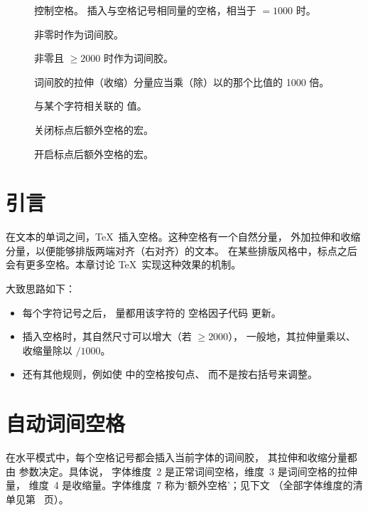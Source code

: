 \documentclass[a4paper]{rapport3}
\newenvironment{inventory}{\begin{description}}{\end{description}}
\begin{document}
\begin{inventory}

\item []
      控制空格。
      插入与空格记号相同量的空格，相当于 ${}=1000$ 时。

\item [] 
      非零时作为词间胶。

\item [] 
      非零且 ${}\geq2000$ 时作为词间胶。

\item [] 
      词间胶的拉伸（收缩）分量应当乘（除）以的那个比值的 1000 倍。

\item [] 
      与某个字符相关联的  值。

\item []
      关闭标点后额外空格的宏。

\item []
      开启标点后额外空格的宏。

\end{inventory}


\section{引言}

在文本的单词之间，\TeX\ 插入空格。这种空格有一个自然分量，
外加拉伸和收缩分量，以便能够排版两端对齐（右对齐）的文本。
在某些排版风格中，标点之后会有更多空格。本章讨论 \TeX\ 实现这种效果的机制。

大致思路如下：
\begin{itemize}
\item 每个字符记号之后， 量都用该字符的 空格因子代码 更新。
\item 插入空格时，其自然尺寸可以增大（若 ${}\geq2000$），
  一般地，其拉伸量乘以、收缩量除以 ${}/1000$。
\item 还有其他规则，例如使  中的空格按句点、
  而不是按右括号来调整。
\end{itemize}

\section{自动词间空格}


在水平模式中，每个空格记号都会插入当前字体的词间胶，
其拉伸和收缩分量都由  参数决定。具体说，
字体维度~2 是正常词间空格，维度~3 是词间空格的拉伸量，
维度~4 是收缩量。字体维度~7 称为`额外空格'；见下文
（全部字体维度的清单见第~\pageref{font:dims} 页）。 
\end{document}
